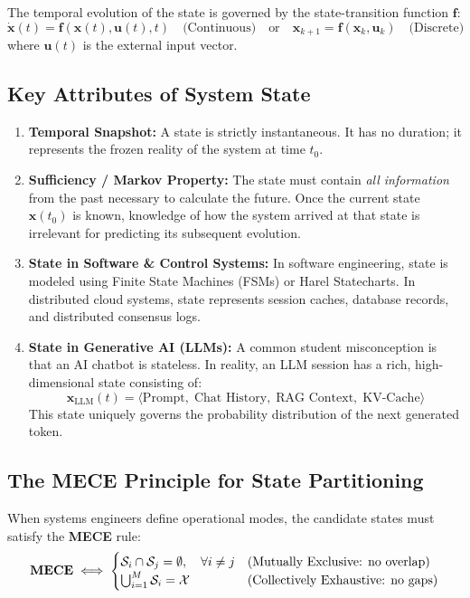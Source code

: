 The temporal evolution of the state is governed by the state-transition function $\mathbf{f}$:
\begin{equation}
    \dot{\mathbf{x}}(t) = \mathbf{f}(\mathbf{x}(t), \mathbf{u}(t), t) \quad \text{(Continuous)} \quad \text{or} \quad \mathbf{x}_{k+1} = \mathbf{f}(\mathbf{x}_k, \mathbf{u}_k) \quad \text{(Discrete)}
\end{equation}
where $\mathbf{u}(t)$ is the external input vector.

\subsection{Key Attributes of System State}
\begin{enumerate}[leftmargin=2em]
    \item \textbf{Temporal Snapshot:} A state is strictly instantaneous. It has no duration; it represents the frozen reality of the system at time $t_0$.
    \item \textbf{Sufficiency / Markov Property:} The state must contain \textit{all information} from the past necessary to calculate the future. Once the current state $\mathbf{x}(t_0)$ is known, knowledge of how the system arrived at that state is irrelevant for predicting its subsequent evolution.
    \item \textbf{State in Software \& Control Systems:} In software engineering, state is modeled using Finite State Machines (FSMs) or Harel Statecharts. In distributed cloud systems, state represents session caches, database records, and distributed consensus logs.
    \item \textbf{State in Generative AI (LLMs):} A common student misconception is that an AI chatbot is stateless. In reality, an LLM session has a rich, high-dimensional state consisting of:
    \begin{equation}
        \mathbf{x}_{\text{LLM}}(t) = \Big\langle \text{Prompt}, \; \text{Chat History}, \; \text{RAG Context}, \; \text{KV-Cache} \Big\rangle
    \end{equation}
    This state uniquely governs the probability distribution of the next generated token.
\end{enumerate}

\subsection{The MECE Principle for State Partitioning}
When systems engineers define operational modes, the candidate states must satisfy the \textbf{MECE} rule:
\begin{equation}
    \text{\textbf{MECE}} \iff \begin{cases}
    \mathcal{S}_i \cap \mathcal{S}_j = \emptyset, \quad \forall i \neq j & \text{(Mutually Exclusive: no overlap)} \\
    \bigcup_{i=1}^M \mathcal{S}_i = \mathcal{X} & \text{(Collectively Exhaustive: no gaps)}
    \end{cases}
\end{equation}

